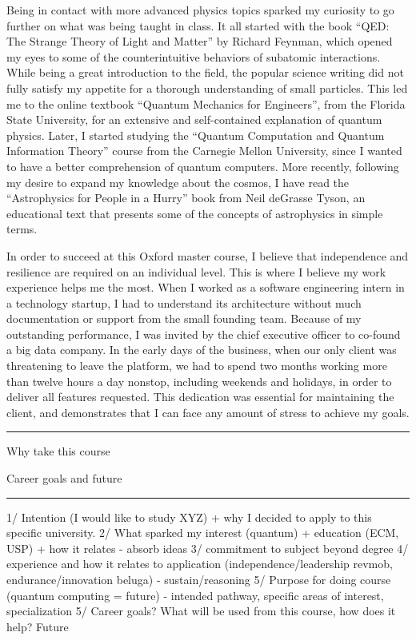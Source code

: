 \documentclass[11pt]{article}
\newcommand*{\NEWLINE}{\vspace{0.75em}}
\begin{document}
Being in contact with more advanced physics topics sparked my curiosity to go further on what was being taught in class. It all started with the book ``QED: The Strange Theory of Light and Matter'' by Richard Feynman, which opened my eyes to some of the counterintuitive behaviors of subatomic interactions. While being a great introduction to the field, the popular science writing did not fully satisfy my appetite for a thorough understanding of small particles. This led me to the online textbook ``Quantum Mechanics for Engineers'', from the Florida State University, for an extensive and self-contained explanation of quantum physics. Later, I started studying the ``Quantum Computation and Quantum Information Theory'' course from the Carnegie Mellon University, since I wanted to have a better comprehension of quantum computers. More recently, following my desire to expand my knowledge about the cosmos, I have read the ``Astrophysics for People in a Hurry'' book from Neil deGrasse Tyson, an educational text that presents some of the concepts of astrophysics in simple terms.
\NEWLINE{}

In order to succeed at this Oxford master course, I believe that independence and resilience are required on an individual level. This is where I believe my work experience helps me the most. When I worked as a software engineering intern in a technology startup, I had to understand its architecture without much documentation or support from the small founding team. Because of my outstanding performance, I was invited by the chief executive officer to co-found a big data company. In the early days of the business, when our only client was threatening to leave the platform, we had to spend two months working more than twelve hours a day nonstop, including weekends and holidays, in order to deliver all features requested. This dedication was essential for maintaining the client, and demonstrates that I can face any amount of stress to achieve my goals.


\noindent\rule{\textwidth}{1pt}

Why take this course

Career goals and future

\noindent\rule{\textwidth}{1pt}

1/ Intention (I would like to study XYZ) + why I decided to apply to this
specific university.
2/ What sparked my interest (quantum) + education (ECM, USP) + how it relates - absorb ideas
3/ commitment to subject beyond degree
4/ experience and how it relates to application (independence/leadership revmob, endurance/innovation beluga) - sustain/reasoning
5/ Purpose for doing course (quantum computing = future) - intended pathway, specific areas of interest, specialization
5/ Career goals? What will be used from this course, how does it help? Future
\end{document}
